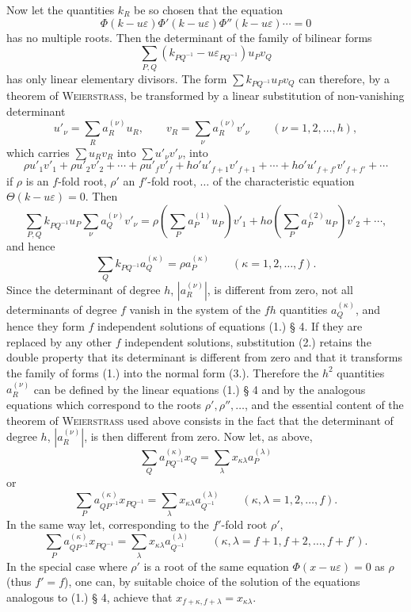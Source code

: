 \documentclass[11pt]{article}
\newcommand{\eps}{\varepsilon}
\begin{document}
Now let the quantities $k_R$ be so chosen that the equation
\[
\Phi(k-u\eps)\Phi'(k-u\eps)\Phi''(k-u\eps)\cdots=0
\]
has no multiple roots. Then the determinant of the family of bilinear forms
\begin{equation}\tag{1.}
\sum_{P,Q}(k_{PQ^{-1}}-u\eps_{PQ^{-1}})u_Pv_Q
\end{equation}
has only linear elementary divisors. The form $\sum k_{PQ^{-1}}u_Pv_Q$ can therefore, by a theorem of \textsc{Weierstrass}, be transformed by a linear substitution of non-vanishing determinant
\begin{equation}\tag{2.}
u'_\nu=\sum_R a^{(\nu)}_R u_R,\qquad v_R=\sum_\nu a^{(\nu)}_R v'_\nu\qquad(\nu=1,2,\ldots,h),
\end{equation}
which carries $\sum u_Rv_R$ into $\sum u'_\nu v'_\nu$, into
\begin{equation}\tag{3.}
\rho u'_1v'_1+\rho u'_2v'_2+\cdots+\rho u'_fv'_f+
ho'u'_{f+1}v'_{f+1}+\cdots+
ho'u'_{f+f'}v'_{f+f'}+\cdots
\end{equation}
if $\rho$ is an $f$-fold root, $\rho'$ an $f'$-fold root, $\ldots$ of the characteristic equation $\Theta(k-u\eps)=0$. Then
\[
\sum_{P,Q}k_{PQ^{-1}}u_P\sum_\nu a^{(\nu)}_Qv'_\nu
=\rho\left(\sum_P a^{(1)}_P u_P\right)v'_1+
ho\left(\sum_P a^{(2)}_P u_P\right)v'_2+\cdots,
\]
and hence
\[
\sum_Q k_{PQ^{-1}}a^{(\kappa)}_Q=\rho a^{(\kappa)}_P\qquad(\kappa=1,2,\ldots,f).
\]
Since the determinant of degree $h$, $|a^{(\nu)}_R|$, is different from zero, not all determinants of degree $f$ vanish in the system of the $fh$ quantities $a^{(\kappa)}_Q$, and hence they form $f$ independent solutions of equations (1.) § 4. If they are replaced by any other $f$ independent solutions, substitution (2.) retains the double property that its determinant is different from zero and that it transforms the family of forms (1.) into the normal form (3.). Therefore the $h^2$ quantities $a^{(\nu)}_R$ can be defined by the linear equations (1.) § 4 and by the analogous equations which correspond to the roots $\rho',\rho'',\ldots$, and the essential content of the theorem of \textsc{Weierstrass} used above consists in the fact that the determinant of degree $h$, $|a^{(\nu)}_R|$, is then different from zero. Now let, as above,
\[
\sum_Q a^{(\kappa)}_{PQ^{-1}}x_Q=\sum_\lambda x_{\kappa\lambda}a^{(\lambda)}_P
\]
or
\[
\sum_P a^{(\kappa)}_{QP^{-1}}x_{PQ^{-1}}=\sum_\lambda x_{\kappa\lambda}a^{(\lambda)}_{Q^{-1}}\qquad(\kappa,\lambda=1,2,\ldots,f).
\]
In the same way let, corresponding to the $f'$-fold root $\rho'$,
\[
\sum_P a^{(\kappa)}_{QP^{-1}}x_{PQ^{-1}}=\sum_\lambda x_{\kappa\lambda}a^{(\lambda)}_{Q^{-1}}\qquad(\kappa,\lambda=f+1,f+2,\ldots,f+f').
\]
In the special case where $\rho'$ is a root of the same equation $\Phi(x-u\eps)=0$ as $\rho$ (thus $f'=f$), one can, by suitable choice of the solution of the equations analogous to (1.) § 4, achieve that $x_{f+\kappa,f+\lambda}=x_{\kappa\lambda}$.
\end{document}
